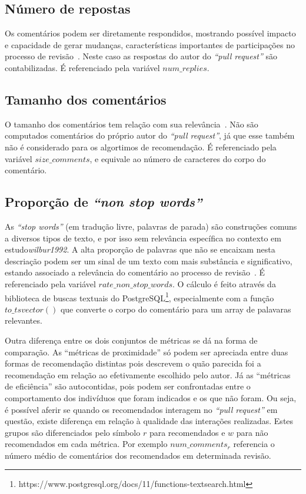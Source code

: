 \documentclass[12pt,openany,oneside,a4paper,english,brazil]{abntbibufjf}
\begin{document}
    \subsection{Número de repostas}
      Os comentários podem ser diretamente respondidos, mostrando possível impacto e capacidade de gerar mudanças, características importantes de participações no processo de revisão~\cite{bosu2015}. Neste caso as respostas do autor do \textit{``pull request''} são contabilizadas. É referenciado pela variável $num\_replies$.

    \subsection{Tamanho dos comentários}
      O tamanho dos comentários tem relação com sua relevância~\cite{rahman2017}. Não são computados comentários do próprio autor do \textit{``pull request''}, já que esse também não é considerado para os algortimos de recomendação. É referenciado pela variável $size\_comments$, e equivale ao número de caracteres do corpo do comentário.


    \subsection{Proporção de \textit{``non stop words''}}
    As \textit{``stop words''} (em tradução livre, palavras de parada) são construções comuns a diversos tipos de texto, e por isso sem relevância específica no contexto em estudo\textit{wilbur1992}.
    A alta proporção de palavras que não se encaixam nesta descriação podem ser um sinal de um texto com mais substância e significativo, estando associado a relevância do comentário ao processo de revisão~\cite{rahman2017}. É referenciado pela variável $rate\_non\_stop\_words$. O cálculo é feito através da biblioteca de buscas textuais do PostgreSQL\footnote{https://www.postgresql.org/docs/11/functions-textsearch.html}, especialmente com a função $to\_tsvector()$ que converte o corpo do comentário para um array de palavaras relevantes.

    Outra diferença entre os dois conjuntos de métricas se dá na forma de comparação. As ``métricas de proximidade'' só podem ser apreciada entre duas formas de recomendação distintas pois descrevem o quão parecida foi a recomendação em relação ao efetivamente escolhido pelo autor. Já as ``métricas de eficiência'' são autocontidas, pois podem ser confrontadas entre o comportamento dos indivíduos que foram indicados e os que não foram. Ou seja, é possível aferir se quando os recomendados interagem no \textit{``pull request''} em questão, existe diferença em relação à qualidade das interações realizadas. Estes grupos são diferenciados pelo símbolo $r$ para recomendados e $w$ para não recomendados em cada métrica. Por exemplo $num\_comments_r$ referencia o número médio de comentários dos recomendados em determinada revisão.
\end{document}
